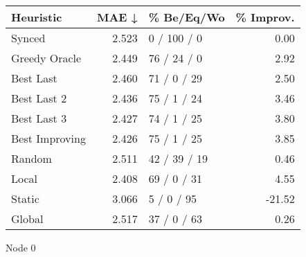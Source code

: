 \begin{tabular}{lrlr}
\toprule
\textbf{Heuristic} & \textbf{MAE ↓} & \textbf{\% Be/Eq/Wo} & \textbf{\% Improv.} \\
\midrule
            Synced &          2.523 &          0 / 100 / 0 &                0.00 \\
     Greedy Oracle &          2.449 &          76 / 24 / 0 &                2.92 \\
         Best Last &          2.460 &          71 / 0 / 29 &                2.50 \\
       Best Last 2 &          2.436 &          75 / 1 / 24 &                3.46 \\
       Best Last 3 &          2.427 &          74 / 1 / 25 &                3.80 \\
    Best Improving &          2.426 &          75 / 1 / 25 &                3.85 \\
            Random &          2.511 &         42 / 39 / 19 &                0.46 \\
             Local &          2.408 &          69 / 0 / 31 &                4.55 \\
            Static &          3.066 &           5 / 0 / 95 &              -21.52 \\
            Global &          2.517 &          37 / 0 / 63 &                0.26 \\
\bottomrule
\end{tabular}
\caption{Node 0}
\label{tab:ds_non_lr01_le2_bs4_0}
